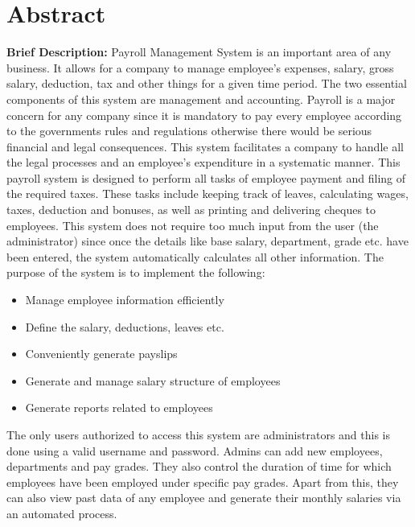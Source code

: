 \documentclass[12pt]{article}
\begin{document}
\section{Abstract}
\noindent
\textbf{Brief Description:}
\newline
\newline
Payroll Management System is an important area of any business. It allows for a company to manage employee's expenses, salary, gross salary, deduction, tax and other things for a given time period. The two essential components of this system are management and accounting. Payroll is a major concern for any company since it is mandatory to pay every employee according to the governments rules and regulations otherwise there would be serious financial and legal consequences. This system facilitates a company to handle all the legal processes and an employee's expenditure in a systematic manner.
\newline
\newline
This payroll system is designed to perform all tasks of employee payment and filing of the required taxes. These tasks include keeping track of leaves, calculating wages, taxes, deduction and bonuses, as well as printing and delivering cheques to employees. This system does not require too much input from the user (the administrator) since once the details like base salary, department, grade etc. have been entered, the system automatically calculates all other information.
\newline
\newline
The purpose of the system is to implement the following:
\begin{itemize}
    \item Manage employee information efficiently
    \item Define the salary, deductions, leaves etc.
    \item Conveniently generate payslips
    \item Generate and manage salary structure of employees
    \item Generate reports related to employees
\end{itemize}
\noindent
The only users authorized to access this system are administrators and this is done using a valid username and password. Admins can add new employees, departments and pay grades. They also control the duration of time for which employees have been employed under specific pay grades. Apart from this, they can also view past data of any employee and generate their monthly salaries via an automated process.
\end{document}
